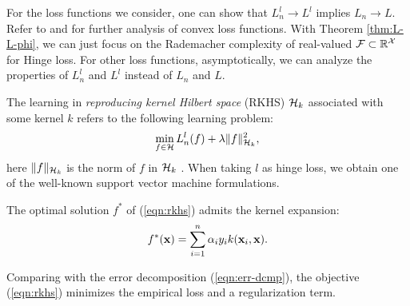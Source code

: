 For the loss functions we consider, one can show that $L^l_n\rightarrow L^l$
implies $L_n\rightarrow L$. Refer to \cite{as/Zhang04} and \cite{jasa/BartlettJM06} for further analysis of convex loss functions. With Theorem \ref{thm:L-L-phi}, we can just focus on the Rademacher complexity of real-valued ${\cal F} \subset {\mathbb R}^{\cal X}$ for Hinge loss. For other loss functions, asymptotically, we can analyze the properties of $L^l_n$ and $L^l$ instead of $L_n$ and $L$.

The learning in {\em reproducing kernel Hilbert space} (RKHS) ${\cal H}_k$ associated
with some kernel $k$ refers to the following learning problem:
\begin{equation}
\min_{f \in \h} L^{l}_n(f) + \lambda \|f\|^2_{\h_k}, \label{eqn:rkhs}
\end{equation}
here $\|f\|_{{\cal H}_k}$ is the norm of $f$ in ${\cal H}_k$ . When taking $l$ as
hinge loss, we obtain one of the well-known support vector machine
formulations.

\begin{theorem} \cite{colt/ScholkopfHS01}
The optimal solution $f^*$ of (\ref{eqn:rkhs}) admits the kernel expansion:
\[
f^*(\mathbf{x}) = \sum_{i=1}^n {\alpha}_iy_ik(\mathbf{x}_i, \mathbf{x}).
\]
\end{theorem}

Comparing with the error decomposition (\ref{eqn:err-dcmp}), the objective
(\ref{eqn:rkhs}) minimizes the empirical loss and a regularization term.

